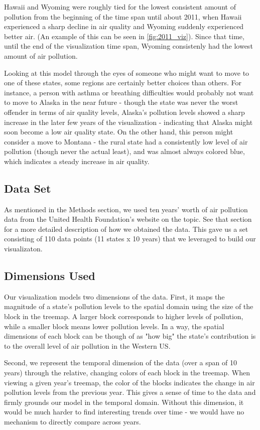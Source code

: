 \documentclass[journal]{vgtc}                %
\begin{document}
Hawaii and Wyoming were roughly tied for the lowest consistent amount of pollution from the beginning of the time span until about 2011, when Hawaii
experienced a sharp decline in air quality and Wyoming suddenly experienced better air. (An example of this can be seen in \ref{fig:2011_viz}).
Since that time, until the end of the visualization time span, Wyoming consistenly had the lowest amount of air pollution. 

Looking at this model through the eyes of someone who might want to move to one of these states, some regions are certainly better choices than 
others. For instance, a person with asthma or breathing difficulties would probably not want to move to Alaska in the near future - though
the state was never the worst offender in terms of air quality levels, Alaska's pollution levels showed a sharp increase in the later few
years of the visualization - indicating that Alaska might soon become a low air quality state. On the other hand, this person might consider
a move to Montana - the rural state had a consistently low level of air pollution (though never the actual least), and was almost always
colored blue, which indicates a steady increase in air quality.

\subsection{Data Set}

As mentioned in the Methods section, we used ten years' worth of air pollution data from the United Health Foundation's
website on the topic. See that section for a more detailed description of how we obtained the data. 
This gave us a set consisting of 110 data points (11 states x 10 years) that we leveraged to build our visualizaton. 

\subsection{Dimensions Used}

Our visualization models two dimensions of the data. First, it maps the magnitude of a state's pollution levels to 
the spatial domain using the size of the block in the treemap. A larger block corresponds to higher levels of pollution, 
while a smaller block means lower pollution levels. In a way, the spatial dimensions of each block can be though of as 
"how big" the state's contribution is to the overall level of air pollution in the Western US.

Second, we represent the temporal dimension of the data (over a span of 10 years) through the relative, changing colors of each block
in the treemap. When viewing a given year's treemap, the color of the blocks indicates the change in air pollution levels 
from the previous year. This gives a sense of time to the data and firmly grounds our model in the temporal domain. Without
this dimension, it would be much harder to find interesting trends over time - we would have no mechanism to directly compare 
across years.
\end{document}

